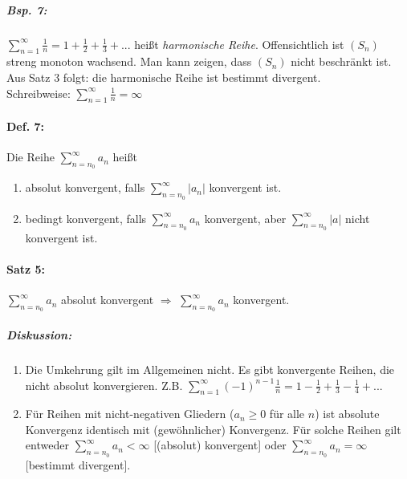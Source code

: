 \subparagraph{Bsp. 7:} $\sum_{n=1}^\infty \frac{1}{n}=1+\frac{1}{2}+\frac{1}{3}+...$ heißt \emph{harmonische Reihe}. Offensichtlich ist $(S_n)$ streng monoton wachsend. Man kann zeigen, dass $(S_n)$ nicht beschränkt ist. Aus Satz 3 folgt: die harmonische Reihe ist bestimmt divergent.\\
Schreibweise: $\sum_{n=1}^\infty \frac{1}{n}=\infty$

\paragraph{Def. 7:} Die Reihe $\sum_{n=n_0}^\infty a_n$ heißt
\begin{enumerate}[label=(\alph*)]
\item absolut konvergent, falls $\sum_{n=n_0}^\infty|a_n|$ konvergent ist.
\item bedingt konvergent, falls $\sum_{n=n_0}^\infty a_n$ konvergent, aber $\sum_{n=n_0}^\infty |a|$ nicht konvergent ist.
\end{enumerate}

\paragraph{Satz 5:} $\sum_{n=n_0}^\infty a_n$ absolut konvergent $\Rightarrow$ $\sum_{n=n_0}^\infty a_n$ konvergent.
\subparagraph{Diskussion:}
\begin{enumerate}
\item Die Umkehrung gilt im Allgemeinen nicht. Es gibt konvergente Reihen, die nicht absolut konvergieren. Z.B. $\sum_{n=1}^\infty (-1)^{n-1}\frac{1}{n}=1-\frac{1}{2}+\frac{1}{3}-\frac{1}{4}+...$
\item Für Reihen mit nicht-negativen Gliedern ($a_n \geq 0$ für alle $n$) ist absolute Konvergenz identisch mit (gewöhnlicher) Konvergenz. Für solche Reihen gilt entweder $\sum_{n=n_0}^\infty a_n<\infty$ [(absolut) konvergent] oder $\sum_{n=n_0}^\infty a_n = \infty$ [bestimmt divergent].
\end{enumerate}

